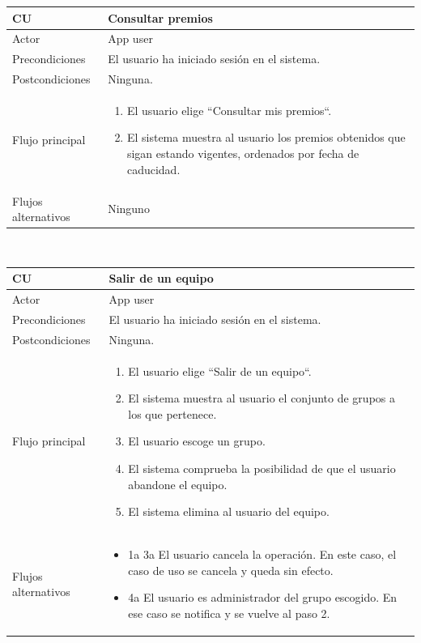 \documentclass[twoside]{report}
\newcommand\addrow[2]{#1 &#2\\ }
\newcommand\addheading[2]{#1 &#2\\ \hline}
\newcommand\tabularhead{\begin{tabular}{lp{0.7\textwidth}}
\hline
}
\newenvironment{usecase}{\tabularhead}
{\hline\end{tabular}}
\begin{document}
\vspace{0.5cm}

\begin{usecase}
  \addheading{\textbf{CU\arabic{usecase}}}{Consultar premios} 
  \addrow{Actor}{App user}
  \addrow{Precondiciones}{El usuario ha iniciado sesión en el sistema.}
  \addrow{Postcondiciones}{Ninguna.}
  \addrow{Flujo principal}{
  		\begin{enumerate}
  		\item El usuario elige “Consultar mis premios“.
  		\item El sistema muestra al usuario los premios obtenidos que sigan estando vigentes, ordenados por fecha de caducidad.
  		\end{enumerate}
  }
  \addrow{Flujos alternativos}{Ninguno}
\end{usecase}\\

\vspace{0.5cm}

\begin{usecase}
  \addheading{\textbf{CU\arabic{usecase}}}{Salir de un equipo} 
  \addrow{Actor}{App user}
  \addrow{Precondiciones}{El usuario ha iniciado sesión en el sistema.}
  \addrow{Postcondiciones}{Ninguna.}
  \addrow{Flujo principal}{
  		\begin{enumerate}
  		\item El usuario elige “Salir de un equipo“. %
  		\item El sistema muestra al usuario el conjunto de grupos a los que pertenece. %
  		\item El usuario escoge un grupo. %
  		\item El sistema comprueba la posibilidad de que el usuario abandone el equipo. %
  		\item El sistema elimina al usuario del equipo.
  		\end{enumerate}
  }
  \addrow{Flujos alternativos}{
  		\begin{itemize}
  		\item 1a 3a El usuario cancela la operación. En este caso, el caso de uso se cancela y queda sin efecto.
  		\item 4a El usuario es administrador del grupo escogido. En ese caso se notifica y se vuelve al paso 2.
  		\end{itemize}
  }
\end{usecase}\\
\end{document}
